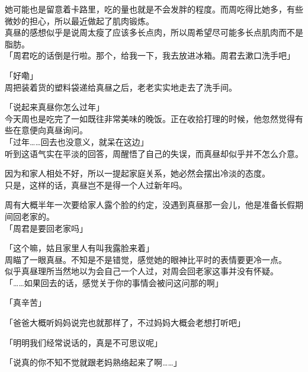她可能也是留意着卡路里，吃的量也就是不会发胖的程度。而周吃得比她多，有些微妙的担心，所以最近做起了肌肉锻炼。\\

真昼的感想似乎是说周太瘦了应该多长点肉，所以周希望尽可能多长点肌肉而不是脂肪。\\

「周君吃的话倒是行啦。那个，给我一下，我去放进冰箱。周君去漱口洗手吧」

「好嘞」\\

周把装着货的塑料袋递给真昼之后，老老实实地走去了洗手间。\\

\vspace{2\baselineskip}

「说起来真昼你怎么过年」\\

今天周也是吃完了一如既往非常美味的晚饭。正在收拾打理的时候，他忽然觉得有些在意便向真昼询问。\\

「过年……回去也没意义，就呆在这边」\\

听到这语气实在平淡的回答，周醒悟了自己的失误，而真昼却似乎并不怎么介意。

因为和家人相处不好，所以一提起家庭关系，她必然会摆出冷淡的态度。\\

只是，这样的话，真昼岂不是得一个人过新年吗。

周有大概半年一次要给家人露个脸的约定，没遇到真昼那一会儿，他是准备长假期间回老家的。\\

「周君是要回老家吗」

「这个嘛，姑且家里人有叫我露脸来着」\\

周瞄了一眼真昼。不知是不是错觉，感觉她的眼神比平时的表情要更冷一点。\\

似乎真昼理所当然地以为会自己一个人过，对周会回老家这事并没有怀疑。\\

「……如果回去的话，感觉关于你的事情会被问这问那的啊」

「真辛苦」

「爸爸大概听妈妈说完也就那样了，不过妈妈大概会老想打听吧」

「明明我们经常说话的，真是不可思议呢」

「说真的你不知不觉就跟老妈熟络起来了啊……」\\


